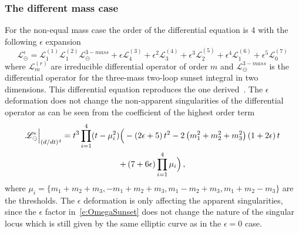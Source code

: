 \documentclass[a4paper,12pt]{article}
\numberwithin{equation}{section}
\numberwithin{figure}{section}
\def\su{\circleddash}
\begin{document}
\subsubsection{The different mass case}\label{sec:2sunset3mass}

For the non-equal mass case the order of the differential equation is
4 with the following $\epsilon$ expansion
\begin{equation}
     \mathscr{L}^{\epsilon}_\su =   \mathscr{L}^{(1)}_1
     \mathscr{L}^{(2)}_1    \mathscr{L}^{3-mass}_\su +\epsilon
     \mathscr{L}^{(3)}_4+\epsilon^2  \mathscr{L}^{(4)}_3+\epsilon^3
     \mathscr{L}^{(5)}_2+ \epsilon^4 \mathscr{L}^{(6)}_1 +\epsilon^5
    \mathscr{L}^{(7)}_0
   \end{equation} 
   where $ \mathscr{L}^{(r)}_m$  are irreducible differential operator
   of  order $m$ and $\mathscr{L}^{3-mass}_\su$ is the differential
   operator for the three-mass two-loop sunset integral in two
   dimensions. This differential equation reproduces the one 
   derived~\cite{Remiddi:2013joa,Remiddi:2016gno}.
%
The $\epsilon$ deformation does not change the non-apparent
singularities of the differential operator as can be seen from the
coefficient of the highest order term
\begin{multline}
  \mathscr{L}^{\epsilon}_\su \Big\vert_{(d/dt)^4}= t^3\prod_{i=1}^4 (t-
  \mu_i^2) \Big(-\left(2 \epsilon +5\right) t^{2}-2
    \left(m_{1}^{2}+m_{2}^{2}+m_{3}^{2}\right) \left(1+2 \epsilon
    \right) t \cr+ \left(7+6 \epsilon \right)\prod_{i=1}^4 \mu_i
\Big)  \, , 
\end{multline}
where $\mu_i=\{m_1+m_2+m_3,-m_1+m_2+m_3,m_1-m_2+m_3,m_1+m_2-m_3\}$ are
the thresholds.  The $\epsilon$ deformation is only affecting the
apparent singularities, since the $\epsilon$ factor
in~\eqref{e:OmegaSunset} does not change the nature of the singular
locus which is still given by the same elliptic curve as in the
$\epsilon=0$ case.
   
\end{document}

